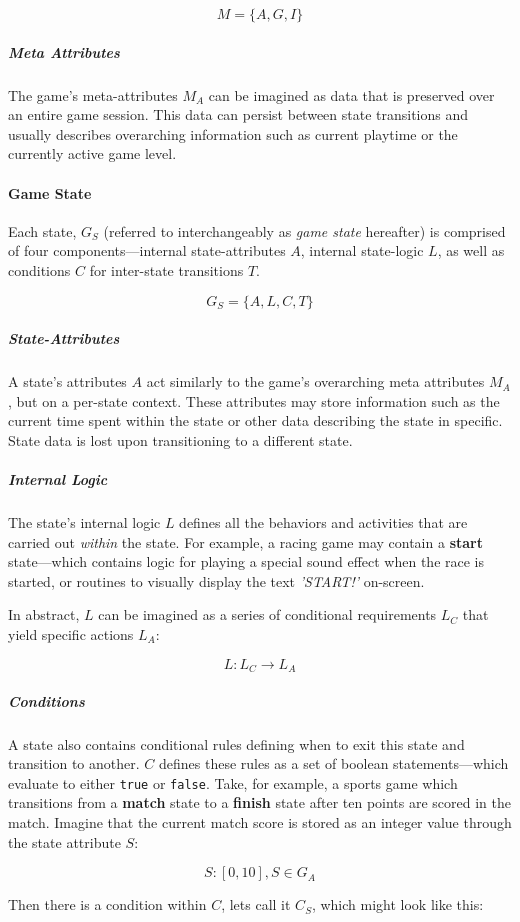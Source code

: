 \documentclass{report}
\begin{document}
$$
M = \{A, G, I\}
$$

\subparagraph{Meta Attributes}
The game's meta-attributes $M_A$ can be imagined as data that is preserved over an entire game session. This data can persist between state transitions and usually describes overarching information such as current playtime or the currently active game level. 

\paragraph{Game State}
Each state, $G_S$ (referred to interchangeably as \textit{game state} hereafter) is comprised of four components---internal state-attributes $A$, internal state-logic $L$, as well as conditions $C$ for inter-state transitions $T$.

$$
G_S = \{ A, L, C, T \}
$$

\subparagraph{State-Attributes}
A state's attributes $A$ act similarly to the game's overarching meta attributes $M_A$, but on a per-state context. These attributes may store information such as the current time spent within the state or other data describing the state in specific. State data is lost upon transitioning to a different state.

\subparagraph{Internal Logic}
The state's internal logic $L$ defines all the behaviors and activities that are carried out \textit{within} the state. For example, a racing game may contain a \textbf{start} state---which contains logic for playing a special sound effect when the race is started, or routines to visually display the text \textit{'START!'} on-screen. 

In abstract, $L$ can be imagined as a series of conditional requirements $L_C$ that yield specific actions $L_A$:

$$L: L_C \longrightarrow L_A$$


\subparagraph{Conditions}
A state also contains conditional rules defining when to exit this state and transition to another. $C$ defines these rules as a set of boolean statements---which evaluate to either \texttt{true} or \texttt{false}.
Take, for example, a sports game which transitions from a \textbf{match} state to a \textbf{finish} state after ten points are scored in the match. Imagine that the current match score is stored as an integer value through the state attribute $S$: 

$$
S: [0, 10],  S \in G_A
$$

Then there is a condition within $C$, lets call it $C_S$, which might look like this:
\end{document}
